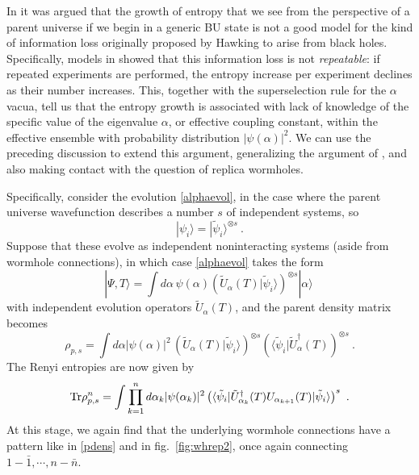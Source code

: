 \documentclass[11pt]{article}
\numberwithin{equation}{section}
\newcommand{\beq}{\begin{equation}}
\newcommand{\eeq}{\end{equation}}
\newcommand{\Tr}{{\rm Tr}}
\begin{document}
In \cite{Cole,GiStInc} it was argued that the growth of entropy that we see from the perspective of a parent universe if we begin in a generic BU state is not a good model for the kind of information loss originally proposed by Hawking to arise from black holes\cite{Hawking:1976ra}.   Specifically, models in \cite{Cole, GiStInc} showed that this information loss is not {\it repeatable}: if repeated experiments are performed, the entropy increase per experiment declines as their number increases.  This, together with the superselection rule for the $\alpha$ vacua, tell us that the entropy growth is associated with 
lack of knowledge of the specific value of the eigenvalue $\alpha$, or effective coupling constant, within the effective ensemble with probability distribution $|\psi(\alpha)|^2$.   We can use the preceding discussion to extend this argument, generalizing the argument  of \cite{Cole,GiStInc}, and also making contact with the question of replica wormholes.

Specifically, consider the evolution \eqref{alphaevol}, in the case where the parent universe wavefunction describes a number $s$ of independent systems, so
\beq
|\psi_i\rangle = |\tilde \psi_i\rangle^{\otimes s}\ .
\eeq
Suppose that these evolve as independent noninteracting systems (aside from wormhole connections), in which case  \eqref{alphaevol} takes the form
\beq
|\Psi, T\rangle = \int d\alpha\, \psi(\alpha) \left(\tilde U_\alpha(T) |\tilde \psi_i\rangle\right)^{\otimes s} |\alpha\rangle\ 
\eeq
with independent evolution operators $\tilde U_\alpha(T)$, and the parent density matrix becomes
\beq
\rho_{p,s}= \int d\alpha |\psi(\alpha)|^2\,  \left(\tilde U_\alpha(T) |\tilde \psi_i\rangle\right)^{\otimes s} \left(\langle \tilde \psi_i| \tilde U^\dagger_\alpha(T) \right)^{\otimes s}\ .
\eeq
The Renyi entropies are now given by
\beq\label{sReyn}
\Tr \rho_{p,s}^n = \int\prod_{k=1}^n  d\alpha_k | \psi(\alpha_k)|^2 \left( \langle \tilde \psi_i| \tilde U^\dagger_{\alpha_k}(T) U_{\alpha_{k+1}}(T) |\tilde \psi_i\rangle   \right)^s\ .
\eeq
At this stage, we again find that the underlying wormhole connections have a pattern like in \eqref{pdens} and in fig.~\ref{fig:whrep2}, once again connecting $1-{\bar 1},\cdots,n-{\bar n}$.
\end{document}
